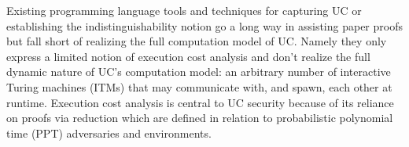 Existing programming language tools and techniques for capturing UC or establishing the indistinguishability notion go a long way in assisting paper proofs but fall short of realizing the full computation model of UC.
Namely they only express a limited notion of execution cost analysis and don't realize the full dynamic nature of UC's computation model: an arbitrary number of interactive Turing machines (ITMs) that may communicate with, and spawn, each other at runtime.
Execution cost analysis is central to UC security because of its reliance on proofs via reduction which are defined in relation to probabilistic polynomial time (PPT) adversaries and environments.

